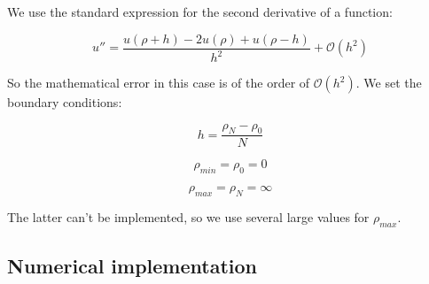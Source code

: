 \documentclass[11pt]{article}
\begin{document}
\begin{flushleft}
We use the standard expression for the second derivative of a function: 

\begin{equation}
u''= \frac{u(\rho + h) - 2u(\rho) + u(\rho - h)}{h^2} + \mathcal{O}(h^2)
\end{equation}

So the mathematical error in this case is of the order of $\mathcal{O}(h^2)$. We set the boundary conditions:

$$
h = \frac{\rho_N - \rho_0}{N}
$$

$$
\rho_{min} = \rho_0 = 0
$$

$$
\rho_{max} = \rho_N = \infty 
$$

The latter can't be implemented, so we use several large values for $\rho_{max}$. 
\end{flushleft}

\subsection*{Numerical implementation}
\end{document}
